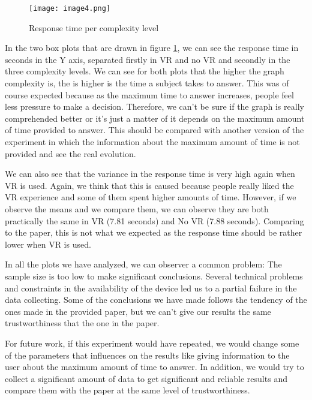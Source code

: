 \begin{figure}[!ht]
\centering
\texttt{[image: image4.png]}
\caption{Response time per complexity level} \label{fig:plot4}
\end{figure}

In the two box plots that are drawn in figure \ref{fig:plot4}, we can see the response time in seconds in the Y
axis, separated firstly in VR and no VR and secondly in the three
complexity levels. We can see for both plots that the higher the graph
complexity is, the is higher is the time a subject takes to answer. This
was of course expected because as the maximum time to answer increases,
people feel less pressure to make a decision. Therefore, we can't be
sure if the graph is really comprehended better or it's just a matter of
it depends on the maximum amount of time provided to answer. This should
be compared with another version of the experiment in which the
information about the maximum amount of time is not provided and see the
real evolution.

We can also see that the variance in the response time is very high
again when VR is used. Again, we think that this is caused because
people really liked the VR experience and some of them spent higher
amounts of time. However, if we observe the means and we compare them,
we can observe they are both practically the same in VR (7.81 seconds)
and No VR (7.88 seconds). Comparing to the paper, this is not what we
expected as the response time should be rather lower when VR is used.

In all the plots we have analyzed, we can observer a common problem: The
sample size is too low to make significant conclusions. Several
technical problems and constraints in the availability of the device led
us to a partial failure in the data collecting. Some of the conclusions
we have made follows the tendency of the ones made in the provided
paper, but we can't give our results the same trustworthiness that the
one in the paper.

For future work, if this experiment would have repeated, we would change
some of the parameters that influences on the results like giving
information to the user about the maximum amount of time to answer. In
addition, we would try to collect a significant amount of data to get
significant and reliable results and compare them with the paper at the
same level of trustworthiness.



